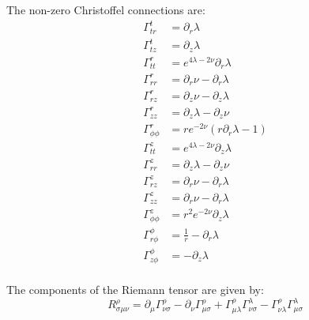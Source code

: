 \documentclass{article}
\begin{document}
The non-zero Christoffel connections are:
\begin{equation}
\begin{aligned}
\Gamma^{t}_{tr}&=\partial_{r}\lambda\\
\Gamma^{t}_{tz}&=\partial_{z}\lambda\\
\Gamma^{r}_{tt}&=e^{4\lambda-2\nu}\partial_{r}\lambda\\
\Gamma^{r}_{rr}&=\partial_{r}\nu-\partial_{r}\lambda\\
\Gamma^{r}_{rz}&=\partial_{z}\nu-\partial_{z}\lambda\\
\Gamma^{r}_{zz}&=\partial_{z}\lambda-\partial_{z}\nu\\
\Gamma^{r}_{\phi\phi}&=re^{-2\nu}\left(r\partial_{r}\lambda-1\right)\\
\Gamma^{z}_{tt}&=e^{4\lambda-2\nu}\partial_{z}\lambda\\
\Gamma^{z}_{rr}&=\partial_{z}\lambda-\partial_{z}\nu\\
\Gamma^{z}_{rz}&=\partial_{r}\nu-\partial_{r}\lambda\\ 
\Gamma^{z}_{zz}&=\partial_{r}\nu-\partial_{r}\lambda\\
\Gamma^{z}_{\phi\phi}&=r^{2}e^{-2\nu}\partial_{z}\lambda\\
\Gamma^{\phi}_{r\phi}&=\frac{1}{r}-\partial_{r}\lambda\\
\Gamma^{\phi}_{z\phi}&=-\partial_{z}\lambda\\
\end{aligned}
\label{eq:christoffel-connections}
\end{equation}

The components of the Riemann tensor are given by:
\begin{equation}
R_{\sigma\mu\nu}^{\rho}=\partial_{\mu}\Gamma_{\nu\sigma}^{\rho}-\partial_{\nu}\Gamma_{\mu\sigma}^{\rho}+\Gamma_{\mu\lambda}^{\rho}\Gamma_{\nu\sigma}^{\lambda}-\Gamma_{\nu\lambda}^{\rho}\Gamma_{\mu\sigma}^{\lambda}
\end{equation}
\end{document}
